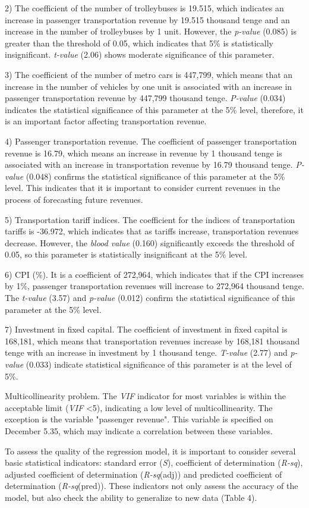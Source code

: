 \begin{multicols}{2}
2) The coefficient of the number of trolleybuses is 19.515, which
indicates an increase in passenger transportation revenue by 19.515
thousand tenge and an increase in the number of trolleybuses by 1 unit.
However, the \emph{p-value} (0.085) is greater than the threshold of
0.05, which indicates that 5\% is statistically insignificant.
\emph{t-value} (2.06) shows moderate significance of this parameter.

3) The coefficient of the number of metro cars is 447,799, which means
that an increase in the number of vehicles by one unit is associated
with an increase in passenger transportation revenue by 447,799 thousand
tenge. \emph{P-value} (0.034) indicates the statistical significance of
this parameter at the 5\% level, therefore, it is an important factor
affecting transportation revenue.

4) Passenger transportation revenue. The coefficient of passenger
transportation revenue is 16.79, which means an increase in revenue by 1
thousand tenge is associated with an increase in transportation revenue
by 16.79 thousand tenge. \emph{P-value} (0.048) confirms the statistical
significance of this parameter at the 5\% level. This indicates that it
is important to consider current revenues in the process of forecasting
future revenues.

5) Transportation tariff indices. The coefficient for the indices of
transportation tariffs is -36.972, which indicates that as tariffs
increase, transportation revenues decrease. However, the \emph{blood
value} (0.160) significantly exceeds the threshold of 0.05, so this
parameter is statistically insignificant at the 5\% level.

6) CPI (\%). It is a coefficient of 272,964, which indicates that if the
CPI increases by 1\%, passenger transportation revenues will increase to
272,964 thousand tenge. The \emph{t-value} (3.57) and \emph{p-value}
(0.012) confirm the statistical significance of this parameter at the
5\% level.

7) Investment in fixed capital. The coefficient of investment in fixed
capital is 168,181, which means that transportation revenues increase by
168,181 thousand tenge with an increase in investment by 1 thousand
tenge. \emph{T-value} (2.77) and \emph{p-value} (0.033) indicate
statistical significance of this parameter is at the level of 5\%.

Multicollinearity problem. The \emph{VIF} indicator for most variables
is within the acceptable limit (\emph{VIF} \textless5), indicating a low
level of multicollinearity. The exception is the variable "passenger
revenue". This variable is specified on December 5.35, which may
indicate a correlation between these variables.

To assess the quality of the regression model, it is important to
consider several basic statistical indicators: standard error
(\emph{S}), coefficient of determination (\emph{R-sq}), adjusted
coefficient of determination (\emph{R-sq}(adj)) and predicted
coefficient of determination (\emph{R-sq}(pred)). These indicators not
only assess the accuracy of the model, but also check the ability to
generalize to new data (Table 4).
\end{multicols}

